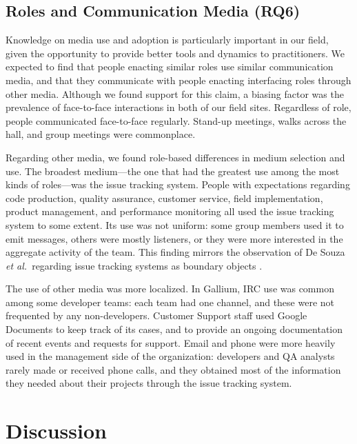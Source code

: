 \documentclass[10pt, conference, compsocconf]{IEEEtran}
\begin{document}
\subsection{Roles and Communication Media (RQ6)}

Knowledge on media use and adoption is particularly important in our field, given the opportunity to provide better tools and dynamics to practitioners. We expected to find that people enacting similar roles use similar communication media, and that they communicate with people enacting interfacing roles through other media. Although we found support for this claim, a biasing factor was the prevalence of face-to-face interactions in both of our field sites. Regardless of role, people communicated face-to-face regularly. Stand-up meetings, walks across the hall, and group meetings were commonplace.

Regarding other media, we found role-based differences in medium selection and use. The broadest medium---the one that had the greatest use among the most kinds of roles---was the issue tracking system. People with expectations regarding code production, quality assurance, customer service, field implementation, product management, and performance monitoring all used the issue tracking system to some extent. Its use was not uniform: some group members used it to emit messages, others were mostly listeners, or they were more interested in the aggregate activity of the team. This finding mirrors the observation of De Souza \emph{et al.}\ regarding issue tracking systems as boundary objects \cite{deSouza2003}.

The use of other media was more localized. In Gallium, IRC use was common among some developer teams: each team had one channel, and these were not frequented by any non-developers. Customer Support staff used Google Documents to keep track of its cases, and to provide an ongoing documentation of recent events and requests for support. Email and phone were more heavily used in the management side of the organization: developers and QA analysts rarely made or received phone calls, and they obtained most of the information they needed about their projects through the issue tracking system.




\section{Discussion}
\end{document}
